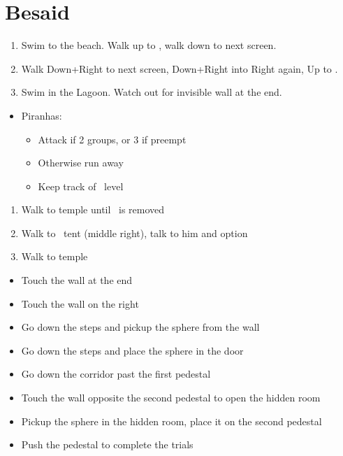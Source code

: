 \chapter{Besaid}

\begin{enumerate}
    \item Swim to the beach. Walk up to \wakka, walk down to next screen.
    \item Walk Down+Right to next screen, Down+Right into Right again, Up to \wakka.
    \item Swim in the Lagoon. Watch out for invisible wall at the end.
\end{enumerate}
\begin{encounters}
    \begin{itemize}
        \item Piranhas:
        \begin{itemize}
            \item Attack if 2 groups, or 3 if preempt
            \item Otherwise run away
            \item Keep track of \tidus\ level
        \end{itemize}
    \end{itemize}
\end{encounters}
\begin{enumerate}[resume]
    \item Walk to temple until \cs\ is removed
    \item Walk to \wakka\ tent (middle right), talk to him and  option
    \item Walk to temple
\end{enumerate}
\begin{trial}
    \begin{itemize}
        \item Touch the wall at the end
        \item Touch the wall on the right
        \item Go down the steps and pickup the sphere from the wall
        \item Go down the steps and place the sphere in the door
        \item Go down the corridor past the first pedestal
        \item Touch the wall opposite the second pedestal to open the hidden room
        \item Pickup the sphere in the hidden room, place it on the second pedestal
        \item Push the pedestal to complete the trials
    \end{itemize}
\end{trial}
